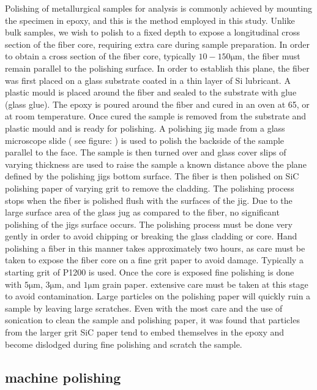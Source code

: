 Polishing of metallurgical samples for analysis is commonly achieved by mounting the specimen in epoxy, and this is the method employed in this study. Unlike bulk samples, we wish to polish to a fixed depth to expose a longitudinal cross section of the fiber core, requiring extra care during sample preparation. In order to obtain a cross section of the fiber core, typically $10 - 150 \si{\micro\meter}$, the fiber must remain parallel to the polishing surface. In order to establish this plane, the fiber was first placed on a glass substrate coated in a thin layer of Si lubricant. A plastic mould is placed around the fiber and sealed to the substrate with glue (glass glue). The epoxy is poured around the fiber and cured in an oven at 65, or at room temperature. Once cured the sample is removed from the substrate and plastic mould and is ready for polishing. A polishing jig made from a glass microscope slide ( see figure: ) is used to polish the backside of the sample parallel to the face. The sample is then turned over and glass cover slips of varying thickness are used to raise the sample a known distance above the plane defined by the polishing jigs bottom surface. The fiber is then polished on SiC polishing paper of varying grit to remove the cladding. The polishing process stops when the fiber is polished flush with the surfaces of the jig. Due to the large surface area of the glass jug as compared to the fiber, no significant polishing of the jigs surface occurs. The polishing process must be done very gently in order to avoid chipping or breaking the glass cladding or core. Hand polishing a fiber in this manner takes approximately two hours, as care must be taken to expose the fiber core on a fine grit paper to avoid damage. Typically a  starting grit of P1200 is used. Once the core is exposed fine polishing is done with $5 \si{\micro\meter}$, $3 \si{\micro\meter}$, and $1 \si{\micro\meter}$ grain paper. extensive care must be taken at this stage to avoid contamination. Large particles on the polishing paper will quickly ruin a sample by leaving large scratches. Even with the most care and the use of sonication to clean the sample and polishing paper, it was found that particles from the larger grit SiC paper tend to embed themselves in the epoxy and become dislodged during fine polishing and scratch the sample. 


\subsection{machine polishing}

